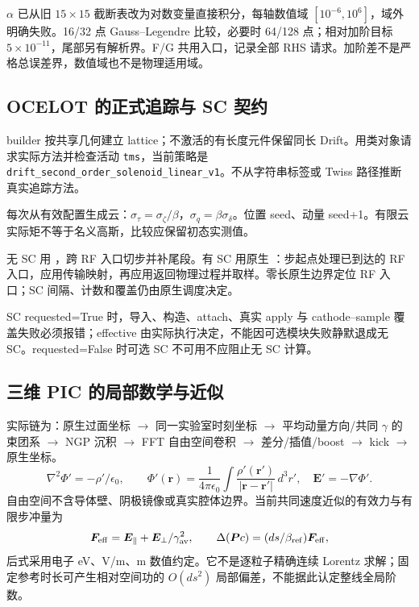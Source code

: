 $\alpha$ 已从旧 $15\times15$ 截断表改为对数变量直接积分，每轴数值域 $[10^{-6},10^6]$，域外明确失败。16/32 点 Gauss--Legendre 比较，必要时 64/128 点；相对加阶目标 $5\times10^{-11}$，尾部另有解析界。F/G 共用入口，记录全部 RHS 请求。加阶差不是严格总误差界，数值域也不是物理适用域。

\subsection{OCELOT 的正式追踪与 SC 契约}
builder 按共享几何建立 lattice；不激活的有长度元件保留同长 Drift。用类对象请求实际方法并检查活动 \texttt{tms}，当前策略是 \texttt{drift\_second\_order\_solenoid\_linear\_v1}。不从字符串标签或 Twiss 路径推断真实追踪方法。

每次从有效配置生成云：$\sigma_\tau=\sigma_\zeta/\beta$，$\sigma_q=\beta\sigma_\delta$。位置 seed、动量 seed+1。有限云实际矩不等于名义高斯，比较应保留初态实测值。

无 SC 用 ，跨 RF 入口切步并补尾段。有 SC 用原生 ：步起点处理已到达的 RF 入口，应用传输映射，再应用返回物理过程并取样。零长原生边界定位 RF 入口；SC 间隔、计数和覆盖仍由原生调度决定。

SC requested=True 时，导入、构造、attach、真实 apply 与 cathode--sample 覆盖失败必须报错；effective 由实际执行决定，不能因可选模块失败静默退成无 SC。requested=False 时可选 SC 不可用不应阻止无 SC 计算。

\subsection{三维 PIC 的局部数学与近似}
实际链为：原生过面坐标 $\to$ 同一实验室时刻坐标 $\to$ 平均动量方向/共同 $\gamma$ 的束团系 $\to$ NGP 沉积 $\to$ FFT 自由空间卷积 $\to$ 差分/插值/boost $\to$ kick $\to$ 原生坐标。
\begin{equation}
 \nabla^2\Phi'=-\rho'/\epsilon_0,\qquad
 \Phi'(\bm r)=\frac1{4\pi\epsilon_0}\int\frac{\rho'(\bm r')}{|\bm r-\bm r'|}\,d^3r',\quad\bm E'=-\nabla\Phi'.
\end{equation}
自由空间不含导体壁、阴极镜像或真实腔体边界。当前共同速度近似的有效力与有限步冲量为
\begin{equation}
 \bm F_{\rm eff}=\bm E_\parallel+\bm E_\perp/\gamma_{\rm av}^2,\qquad
 \Delta(\bm P c)=(ds/\beta_{\rm ref})\bm F_{\rm eff},
\end{equation}
后式采用电子 eV、V/m、m 数值约定。它不是逐粒子精确连续 Lorentz 求解；固定参考时长可产生相对空间功的 $O(ds^2)$ 局部偏差，不能据此认定整线全局阶数。


